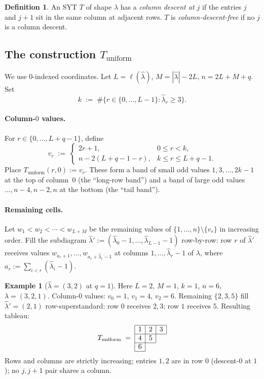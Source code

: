 \documentclass[11pt]{article}
\theoremstyle{definition}
\newtheorem{definition}[theorem]{Definition}
\newtheorem{example}[theorem]{Example}
\newcommand{\bla}{\widehat\lambda}
\newcommand{\elh}{\ell(\bla)}
\newcommand{\Tunif}{T_{\mathrm{uniform}}}
\begin{document}
\begin{definition}\label{def:col-descent}
An SYT $T$ of shape $\lambda$ has a \emph{column descent at $j$} if the entries $j$ and $j+1$ sit in the same column at adjacent rows.  $T$ is \emph{column-descent-free} if no $j$ is a column descent.
\end{definition}

\subsection{The construction $\Tunif$}

We use $0$-indexed coordinates.  Let $L = \elh$, $M = |\bla| - 2L$, $n = 2L + M + q$.  Set
\[
   k \;:=\; \#\{r \in \{0, \ldots, L-1\} : \bla_r \ge 3\}.
\]

\paragraph{Column-$0$ values.}  For $r \in \{0, \ldots, L+q-1\}$, define
\begin{equation}\label{eq:vr-def}
   v_r \;:=\;
   \begin{cases}
      2r+1, & 0 \le r < k,\\
      n - 2(L+q-1-r), & k \le r \le L+q-1.
   \end{cases}
\end{equation}
Place $\Tunif(r, 0) := v_r$.  These form a band of small odd values $1, 3, \ldots, 2k-1$ at the top of column~$0$ (the ``long-row band'') and a band of large odd values $\ldots, n-4, n-2, n$ at the bottom (the ``tail band'').

\paragraph{Remaining cells.}  Let $w_1 < w_2 < \cdots < w_{L+M}$ be the remaining values of $\{1, \ldots, n\} \setminus \{v_r\}$ in increasing order.  Fill the subdiagram $\bla' := (\bla_0 - 1, \ldots, \bla_{L-1} - 1)$ row-by-row: row $r$ of $\bla'$ receives values $w_{a_r + 1}, \ldots, w_{a_r + \bla_r - 1}$ at columns $1, \ldots, \bla_r - 1$ of $\lambda$, where $a_r := \sum_{i < r}(\bla_i - 1)$.

\begin{example}[$\bla = (3,2)$ at $q = 1$]
Here $L = 2$, $M = 1$, $k = 1$, $n = 6$, $\lambda = (3, 2, 1)$.  Column-$0$ values: $v_0 = 1$, $v_1 = 4$, $v_2 = 6$.  Remaining $\{2,3,5\}$ fill $\bla' = (2,1)$ row-superstandard: row $0$ receives $2, 3$; row $1$ receives $5$.  Resulting tableau:
\[
   \Tunif \;=\;
   \begin{array}{|c|c|c|}
     \hline 1 & 2 & 3 \\\hline 4 & 5 \\\cline{1-2} 6 \\\cline{1-1}
   \end{array}
\]
Rows and columns are strictly increasing; entries $1, 2$ are in row $0$ (descent-$0$ at $1$); no $j, j+1$ pair shares a column.
\end{example}
\end{document}
